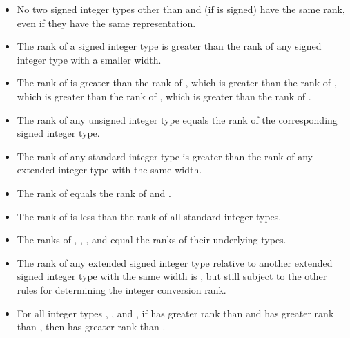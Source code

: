 \begin{itemize}
\item No two signed integer types other than  and  (if  is signed) have the same rank, even if they have
the same representation.

\item The rank of a signed integer type is greater than the rank
of any signed integer type with a smaller width.

\item The rank of  is greater
than the rank of , which is greater than
the rank of , which is greater than the rank of
, which is greater than the rank of
.

\item The rank of any unsigned integer type equals the rank of the
corresponding signed integer type.

\item The rank of any standard integer type is greater than the
rank of any extended integer type with the same width.

\item The rank of  equals the rank of 
and .

\item The rank of  is less than the rank of all
standard integer types.

\item
{}%
%
%
The ranks of , , , and
 equal the ranks of their underlying
types.

\item The rank of any extended signed integer type relative to another
extended signed integer type with the same width is , but still subject to the other rules for determining the integer
conversion rank.

\item For all integer types , , and , if
 has greater rank than  and  has greater
rank than , then  has greater rank than
.
\end{itemize}

